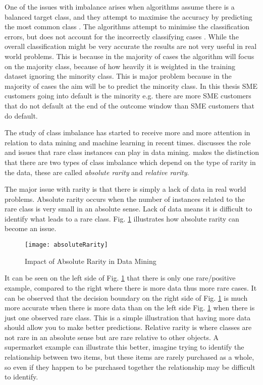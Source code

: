 One of the issues with imbalance arises when algorithms assume there is a balanced target class, and they attempt to maximise the accuracy by predicting the most common class \citep{drummond_severe_2005}. The algorithms attempt to minimise the classification errors, but does not account for the incorrectly classifying cases \citep{seiffert_improving_2009}. While the overall classification might be very accurate the results are not very useful in real world problems. This is because in the majority of cases the algorithm will focus on the majority class, because of how heavily it is weighted in the training dataset ignoring the minority class. This is major problem because in the majority of cases the aim will be to predict the minority class. In this thesis SME customers going into default is the minority e.g. there are more SME customers that do not default at the end of the outcome window than SME customers that do default.

The study of class imbalance has started to receive more and more attention in relation to data mining and machine learning in recent times. \cite{weiss_mining_2004} discusses the role and issues that rare class instances can play in data mining. \cite{weiss_mining_2004} makes the distinction that there are two types of class imbalance which depend on the type of rarity in the data, these are called \textit{absolute rarity} and \textit{relative rarity}.

The major issue with rarity is that there is simply a lack of data in real world problems. Absolute rarity occurs when the number of instances related to the rare class is very small in an absolute sense. Lack of data means it is difficult to identify what leads to a rare class. Fig. \ref{fig:absoluteRarity} illustrates how absolute rarity can become an issue.

\begin{figure}[H]
	\texttt{[image: absoluteRarity]}
	\caption{
		Impact of Absolute Rarity in Data Mining \\ \cite[Source:][]{weiss_mining_2004}
	}
	\label{fig:absoluteRarity}
\end{figure}

It can be seen on the left side of Fig. \ref{fig:absoluteRarity} that there is only one rare/positive example, compared to the right where there is more data thus more rare cases. It can be observed that the decision boundary on the right side of Fig. \ref{fig:absoluteRarity} is much more accurate when there is more data than on the left side Fig. \ref{fig:absoluteRarity} when there is just one observed rare class. This is a simple illustration that having more data should allow you to make better predictions. Relative rarity is where classes are not rare in an absolute sense but are rare relative to other objects. A supermarket example can illustrate this better, imagine trying to identify the relationship between two items, but these items are rarely purchased as a whole, so even if they happen to be purchased together the relationship may be difficult to identify.

